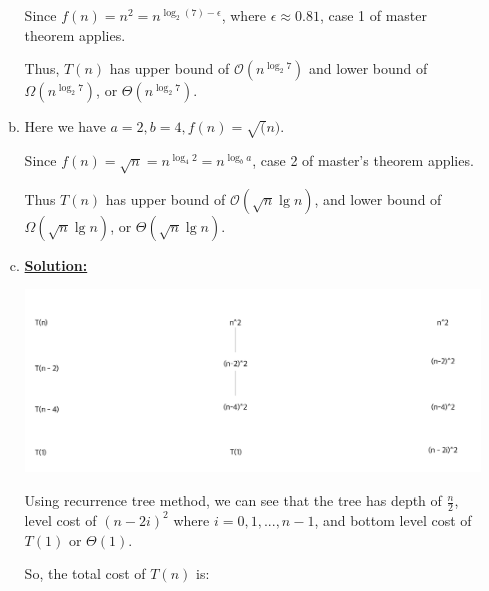 \documentclass[12pt]{article}
\begin{document}
\begin{enumerate}[1.]
\begin{enumerate}[a)]
        \bigskip

        Since $f(n) = n^2 = n^{\log_2 (7) - \epsilon}$, where $\epsilon \approx 0.81$,
        case 1 of master theorem applies.

        \bigskip

        Thus, $T(n)$ has upper bound of $\mathcal{O}(n^{\log_2 7})$ and lower bound of $\Omega(n^{\log_2 7})$, or $\Theta(n^{\log_2 7})$.

        \bigskip

        \item

        Here we have $a = 2, b = 4 , f(n) = \sqrt(n)$.

        \bigskip

        Since $f(n) = \sqrt{n} = n^{\log_4 2} = n^{\log_b a}$, case 2 of master's theorem
        applies.

        \bigskip

        Thus $T(n)$ has upper bound of $\mathcal{O}(\sqrt{n}\lg n)$, and lower bound of
        $\Omega(\sqrt{n}\lg n)$, or $\Theta(\sqrt{n} \lg n)$.

        \item \underline{\textbf{Solution:}}

        \begin{center}
        \includegraphics[width=\linewidth]{images/worksheet_0_solution_11.png}
        \end{center}

        \bigskip

        Using recurrence tree method, we can see that the tree has depth of $\frac{n}{2}$,
        level cost of $(n-2i)^2$ where $i = 0,1,...,n-1$, and bottom level cost
        of $T(1)$ or $\Theta(1)$.

        \bigskip

        So, the total cost of $T(n)$ is:


\end{enumerate}
\end{enumerate}
\end{document}
